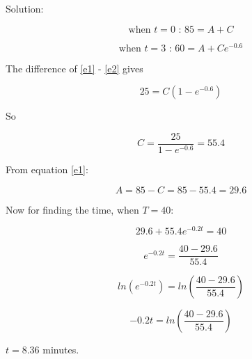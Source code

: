 \begin{center}
\end{center}

\vspace{1cm}

Solution:

\setcounter{equation}{0}
\begin{equation}\label{e1}
\textrm{when }t=0\textrm{ : }85=A+C
\end{equation}

\begin{equation}\label{e2}
\textrm{when }t=3\textrm{ : }60=A+Ce^{-0.6}
\end{equation}

The difference of \ref{e1} - \ref{e2} gives

\[
25=C(1-e^{-0.6})
\]

So


\[
C=\frac{25}{1-e^{-0.6}}=55.4
\]

From equation \ref{e1}:

\[
A=85-C=85-55.4=29.6
\]

\begin{minipage}{\textwidth}
Now for finding the time, when $T=40$:


\[
29.6+55.4e^{-0.2t}=40
\]


\[
e^{-0.2t}=\frac{40-29.6}{55.4}
\]

\[
ln\left(e^{-0.2t}\right)=
ln\left(
\frac{40-29.6}{55.4}
\right)
\]

\[
-0.2t=ln\left(
\frac{40-29.6}{55.4}
\right)
\]

$t=8.36$ minutes.
\end{minipage}



